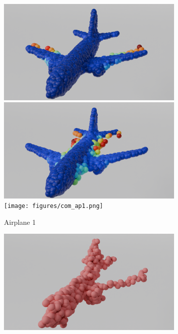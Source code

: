 \begin{figure}[htb]
\begin{subfigure}[t]{\textwidth+20pt\relax}
            \includegraphics[width=\dimexpr\linewidth-20pt\relax]{figures/ens_lin_ap1.png}
            \includegraphics[width=\dimexpr\linewidth-20pt\relax]{figures/iml_lin_ap1.png}
            \texttt{[image: figures/com\_ap1.png]}
            \caption{Airplane 1}
          \end{subfigure}\hfill
          \begin{subfigure}[t]{0.315\textwidth}
            \includegraphics[width=\textwidth]{figures/part_ap2.png}

\end{subfigure}
\end{figure}
